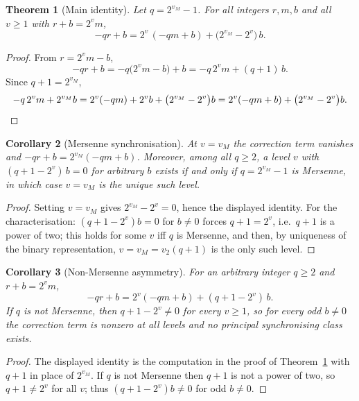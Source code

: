 \documentclass[11pt,reqno]{amsart}
\theoremstyle{plain}
\newtheorem{theorem}{Theorem}[section]
\newtheorem{corollary}[theorem]{Corollary}
\theoremstyle{definition}
\theoremstyle{remark}
\newcommand{\vtwo}{v_{2}}
\newcommand{\vM}{v_{M}}
\begin{document}
\begin{theorem}[Main identity]\label{thm:main-identity}
Let $q = 2^{\vM} - 1$. For all integers $r, m, b$ and all $v \ge 1$ with
$r + b = 2^v m$,
\[
-q r + b = 2^v\,(-q m + b) + \big(2^{\vM} - 2^v\big)\, b .
\]
\end{theorem}

\begin{proof}
From $r = 2^v m - b$,
\[
-q r + b = -q\big(2^v m - b\big) + b = -q\,2^v m + (q + 1)\, b .
\]
Since $q + 1 = 2^{\vM}$,
\[
-q\,2^v m + 2^{\vM} b = 2^v(-q m) + 2^v b + \big(2^{\vM} - 2^v\big) b
= 2^v(-q m + b) + \big(2^{\vM} - 2^v\big) b . \qedhere
\]
\end{proof}

\begin{corollary}[Mersenne synchronisation]\label{cor:mersenne-sync}
At $v = \vM$ the correction term vanishes and
$-q r + b = 2^{\vM}(-q m + b)$. Moreover, among all $q \ge 2$, a level $v$
with $(q + 1 - 2^v)\, b = 0$ for arbitrary $b$ exists if and only if
$q = 2^{\vM} - 1$ is Mersenne, in which case $v = \vM$ is the unique such
level.
\end{corollary}

\begin{proof}
Setting $v = \vM$ gives $2^{\vM} - 2^v = 0$, hence the displayed identity.
For the characterisation: $(q + 1 - 2^v) b = 0$ for $b \ne 0$ forces
$q + 1 = 2^v$, i.e.\ $q + 1$ is a power of two; this holds for some $v$ iff
$q$ is Mersenne, and then, by uniqueness of the binary representation,
$v = \vM = \vtwo(q+1)$ is the only such level.
\end{proof}

\begin{corollary}[Non-Mersenne asymmetry]\label{cor:nonmersenne}
For an arbitrary integer $q \ge 2$ and $r + b = 2^v m$,
\[
-q r + b = 2^v(-q m + b) + (q + 1 - 2^v)\, b .
\]
If $q$ is not Mersenne, then $q + 1 - 2^v \ne 0$ for every $v \ge 1$, so for
every odd $b \ne 0$ the correction term is nonzero at all levels and no
principal synchronising class exists.
\end{corollary}

\begin{proof}
The displayed identity is the computation in the proof of
Theorem~\ref{thm:main-identity} with $q + 1$ in place of $2^{\vM}$. If $q$ is
not Mersenne then $q + 1$ is not a power of two, so $q + 1 \ne 2^v$ for all
$v$; thus $(q + 1 - 2^v) b \ne 0$ for odd $b \ne 0$.
\end{proof}
\end{document}
